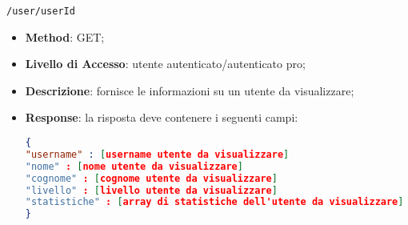 	\item \texttt{/user/userId}
		\begin{itemize}
			\item \textbf{Method}: GET;
			\item \textbf{Livello di Accesso}: utente autenticato/autenticato pro;
			\item \textbf{Descrizione}: fornisce le informazioni su un utente da visualizzare;
			\item \textbf{Response}: la risposta deve contenere i seguenti campi:
\begin{lstlisting}[language=json,firstnumber=1]
{
"username" : [username utente da visualizzare]
"nome" : [nome utente da visualizzare]
"cognome" : [cognome utente da visualizzare]
"livello" : [livello utente da visualizzare]
"statistiche" : [array di statistiche dell'utente da visualizzare]
}
\end{lstlisting}
		\end{itemize}